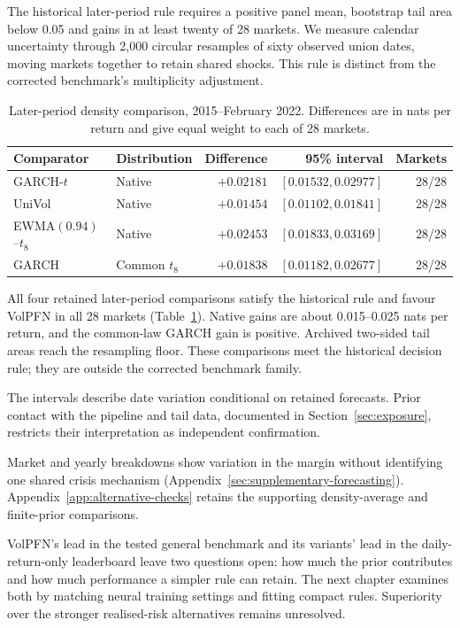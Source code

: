 The historical later-period rule requires a positive panel mean, bootstrap tail area below 0.05 and gains in at least twenty of 28 markets. We measure calendar uncertainty through 2,000 circular resamples of sixty observed union dates, moving markets together to retain shared shocks. This rule is distinct from the corrected benchmark's multiplicity adjustment.

\begin{table}[!htbp]
\centering
\caption[Later-period density comparisons]{Later-period density comparison, 2015--February 2022. Differences are in nats per return and give equal weight to each of 28 markets.}
\label{tab:confirmation-density}
\small
\begin{tabular}{llrrr}
\toprule
Comparator & Distribution & Difference & 95\% interval & Markets \\
\midrule
GARCH-$t$ & Native & $+0.02181$ & $[0.01532,0.02977]$ & 28/28 \\
UniVol & Native & $+0.01454$ & $[0.01102,0.01841]$ & 28/28 \\
EWMA$(0.94)$--$t_8$ & Native & $+0.02453$ & $[0.01833,0.03169]$ & 28/28 \\
GARCH & Common $t_8$ & $+0.01838$ & $[0.01182,0.02677]$ & 28/28 \\
\bottomrule
\end{tabular}
\end{table}

All four retained later-period comparisons satisfy the historical rule and favour VolPFN in all 28 markets (Table~\ref{tab:confirmation-density}). Native gains are about 0.015--0.025 nats per return, and the common-law GARCH gain is positive. Archived two-sided tail areas reach the resampling floor. These comparisons meet the historical decision rule; they are outside the corrected benchmark family.

The intervals describe date variation conditional on retained forecasts. Prior contact with the pipeline and tail data, documented in Section~\ref{sec:exposure}, restricts their interpretation as independent confirmation.

Market and yearly breakdowns show variation in the margin without identifying one shared crisis mechanism (Appendix~\ref{sec:supplementary-forecasting}). Appendix~\ref{app:alternative-checks} retains the supporting density-average and finite-prior comparisons.

VolPFN's lead in the tested general benchmark and its variants' lead in the daily-return-only leaderboard leave two questions open: how much the prior contributes and how much performance a simpler rule can retain. The next chapter examines both by matching neural training settings and fitting compact rules. Superiority over the stronger realised-risk alternatives remains unresolved.
